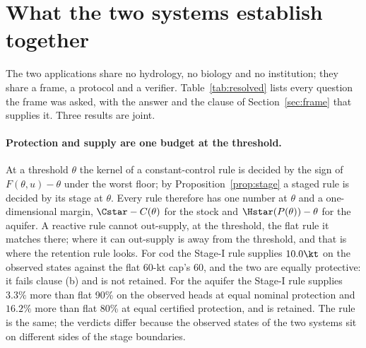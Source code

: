 \section{What the two systems establish together}\label{sec:synthesis}

The two applications share no hydrology, no biology and no institution; they share a frame, a protocol and a verifier. Table~\ref{tab:resolved} lists every question the frame was asked, with the answer and the clause of Section~\ref{sec:frame} that supplies it. Three results are joint.



\paragraph{Protection and supply are one budget at the threshold.}
At a threshold $\theta$ the kernel of a constant-control rule is decided by the sign of $F(\theta,u)-\theta$ under the worst floor; by Proposition~\ref{prop:stage} a staged rule is decided by its stage at $\theta$. Every rule therefore has one number at $\theta$ and a one-dimensional margin, $\Cstar-C(\theta)$ for the stock and $\Hstar(P(\theta))-\theta$ for the aquifer. A reactive rule cannot out-supply, at the threshold, the flat rule it matches there; where it can out-supply is away from the threshold, and that is where the retention rule looks. For cod the Stage-I rule supplies $10.0\kt$ on the observed states against the flat 60-kt cap's 60, and the two are equally protective: it fails clause (b) and is not retained. For the aquifer the Stage-I rule supplies $3.3\%$ more than flat 90\% on the observed heads at equal nominal protection and $16.2\%$ more than flat 80\% at equal certified protection, and is retained. The rule is the same; the verdicts differ because the observed states of the two systems sit on different sides of the stage boundaries.

